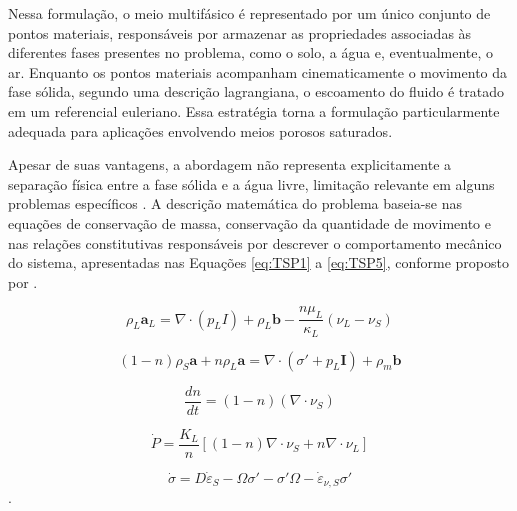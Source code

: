 Nessa formulação, o meio multifásico é representado por um único conjunto de pontos materiais, responsáveis por armazenar as propriedades associadas às diferentes fases presentes no problema, como o solo, a água e, eventualmente, o ar. Enquanto os pontos materiais acompanham cinematicamente o movimento da fase sólida, segundo uma descrição lagrangiana, o escoamento do fluido é tratado em um referencial euleriano. Essa estratégia torna a formulação particularmente adequada para aplicações envolvendo meios porosos saturados.

Apesar de suas vantagens, a abordagem não representa explicitamente a separação física entre a fase sólida e a água livre, limitação relevante em alguns problemas específicos \cite{Ceccato2024}. A descrição matemática do problema baseia-se nas equações de conservação de massa, conservação da quantidade de movimento e nas relações constitutivas responsáveis por descrever o comportamento mecânico do sistema, apresentadas nas Equações \ref{eq:TSP1} a \ref{eq:TSP5}, conforme proposto por .

\begin{equation}
	\rho_L \textbf{a}_L = \nabla \cdot (p_L\textbf{}I)+  \rho_L \textbf{b}-\frac{n\mu_L}{\kappa_L} (\nu_L - \nu_S)
	\label{eq:TSP1}
\end{equation}

\begin{equation}
	(1-n)\rho_S\textbf{a} + n\rho_L\textbf{a} = \nabla \cdot (\sigma'+p_L\textbf{I})+\rho_m\textbf{b}
	\label{eq:TSP2}
\end{equation}

\begin{equation}
	\frac{dn}{dt}=(1-n)(\nabla \cdot \nu_S)
	\label{eq:TSP3}
\end{equation}

\begin{equation}
	\dot{P} = \frac{K_L}{n}[(1-n)\nabla \cdot \nu_S + n\nabla \cdot \nu_L]
	\label{eq:TSP4}
\end{equation}

\begin{equation}
	\dot{\sigma} = D\dot{\varepsilon}_S - \Omega\sigma' - \sigma'\Omega - \dot{\varepsilon}_{\nu,S} \sigma'
	\label{eq:TSP5}
\end{equation}.

